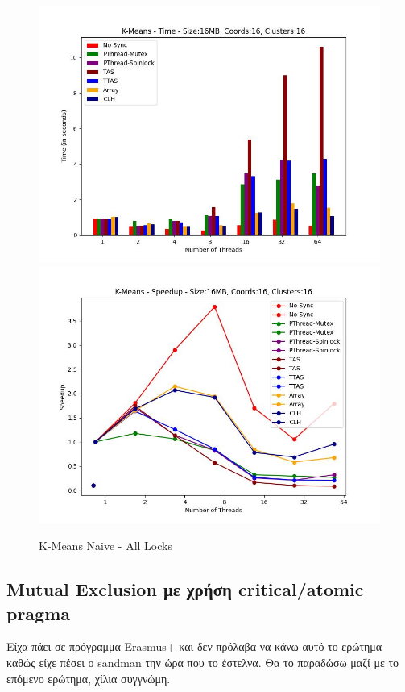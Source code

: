 \documentclass[../final_report.tex]{subfiles}
\begin{document}
\begin{figure}[H]
    \centering
        \includegraphics[scale=0.4]{outFilesCores/plots/kmeans_locks_all.jpg}
        \includegraphics[scale=0.4]{outFilesCores/plots/kmeans_locks_all_speedup.jpg}
    \caption{K-Means Naive - All Locks}
    \label{fig:K-Means Naive - All Locks}
\end{figure}


\subsection{Mutual Exclusion με χρήση critical/atomic pragma}

Είχα πάει σε πρόγραμμα Erasmus+ και δεν πρόλαβα να κάνω αυτό το ερώτημα καθώς είχε πέσει ο sandman την ώρα που το έστελνα.
Θα το παραδώσω μαζί με το επόμενο ερώτημα, χίλια συγγνώμη.
\end{document}
